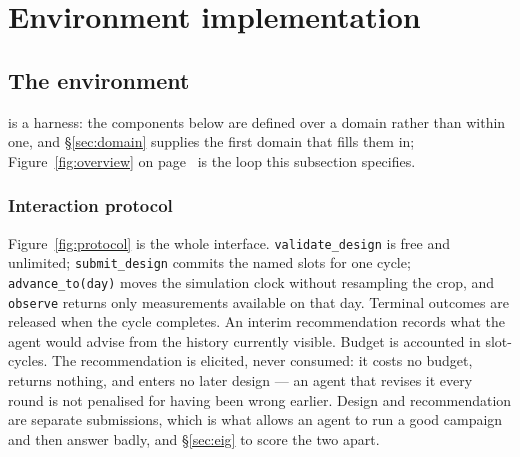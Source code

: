 \section{Environment implementation}
\label{sec:implementation}

\subsection{The environment}
\label{sec:environment}

\slowlab{} is a harness: the components below are defined over a domain rather than within
one, and \S\ref{sec:domain} supplies the first domain that fills them in;
Figure~\ref{fig:overview} on page~\pageref{fig:overview} is the loop this
subsection specifies.


\subsubsection{Interaction protocol}
\label{sec:episode}

Figure~\ref{fig:protocol} is the whole interface. \texttt{validate\_design} is free
and unlimited; \texttt{submit\_design} commits the named slots for one cycle;
\texttt{advance\_to(day)} moves the simulation clock without resampling the crop, and
\texttt{observe} returns only measurements available on that day. Terminal outcomes are
released when the cycle completes. An interim recommendation records what the agent would
advise from the history currently visible. Budget is accounted in slot-cycles. The
recommendation is elicited, never consumed: it costs no budget, returns nothing, and
enters no later design --- an agent that revises it every round is not penalised for
having been wrong earlier. Design and recommendation are separate submissions, which is
what allows an agent to run a good campaign and then answer badly, and \S\ref{sec:eig} to
score the two apart.

